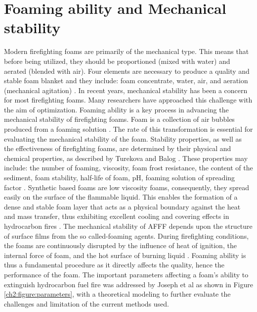 \documentclass[12pt]{report}
\begin{document}
\section{Foaming ability and Mechanical stability}
Modern firefighting foams are primarily of the mechanical type. This means that before being utilized, they should be proportioned (mixed with water) and aerated (blended with air). Four elements are necessary to produce a quality and stable foam blanket and they include: foam concentrate, water, air, and aeration (mechanical agitation) \cite{oguike2013study}.
In recent years, mechanical stability has been a concern for most firefighting foams. Many researchers have approached this challenge with the aim of optimization. Foaming ability is a key process in advancing the mechanical stability of firefighting foams. Foam is a collection of air bubbles produced from a foaming solution \cite{oguike2013study}. The rate of this transformation is essential for evaluating the mechanical stability of the foam. Stability properties, as well as the effectiveness of firefighting foams, are determined by their physical and chemical properties, as described by Turekova and Balog \cite{turekova2011environmental}. These properties may include: the number of foaming, viscosity, foam frost resistance, the content of the sediment, foam stability, half-life of foam, pH, foaming solution of spreading factor \cite{turekova2011environmental}.
Synthetic based foams are low viscosity foams, consequently, they spread easily on the surface of the flammable liquid. This enables the formation of a dense and stable foam layer that acts as a physical boundary against the heat and mass transfer, thus exhibiting excellent cooling and covering effects in hydrocarbon fires \cite{xu2020fire}. The mechanical stability of AFFF depends upon the structure of surface films from the so called-foaming agents. During firefighting conditions, the foams are continuously disrupted by the influence of heat of ignition, the internal force of foam, and the hot surface of burning liquid \cite{turekova2011environmental}. Foaming ability is thus a fundamental procedure as it directly affects the quality, hence the performance of the foam. The important parameters affecting a foam's ability to extinguish hydrocarbon fuel fire was addressed by Joseph et al \cite{scheffey1995evaluating} as shown in Figure \ref{ch2:figure:parameters}, with a theoretical modeling to further evaluate the challenges and limitation of the current methods used. 
\end{document}
